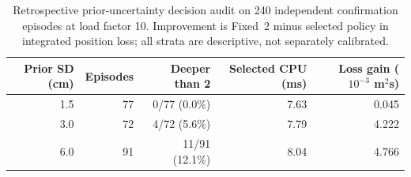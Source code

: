\begin{table}[t]\centering\small
\caption{Retrospective prior-uncertainty decision audit on 240 independent confirmation episodes at load factor 10. Improvement is Fixed~2 minus selected policy in integrated position loss; all strata are descriptive, not separately calibrated.}\label{tab:context-audit}
\begin{tabular}{@{}rrrrr@{}}\toprule
Prior SD (cm) & Episodes & Deeper than 2 & Selected CPU (ms) & Loss gain ($10^{-3}$ m$^2$s)\\\midrule
1.5 & 77 & 0/77 (0.0\%) & 7.63 & 0.045 \\
3.0 & 72 & 4/72 (5.6\%) & 7.79 & 4.222 \\
6.0 & 91 & 11/91 (12.1\%) & 8.04 & 4.766 \\
\bottomrule\end{tabular}
\end{table}
